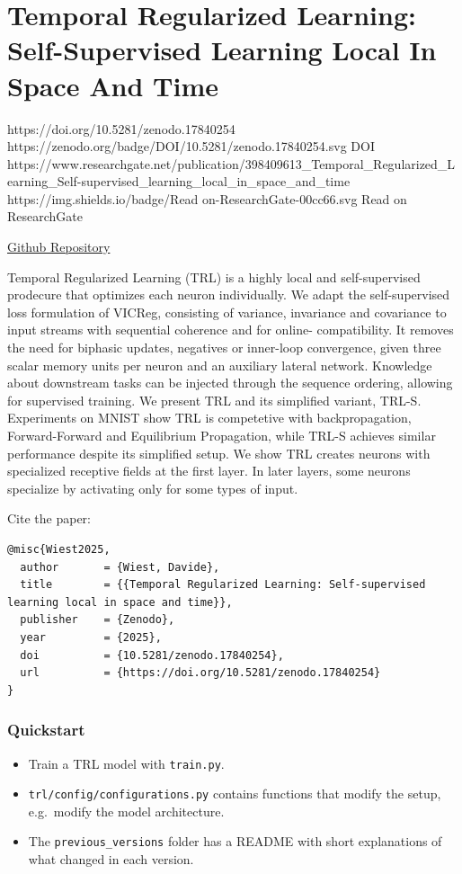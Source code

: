 \documentclass[11pt]{article}
\begin{document}
\section{Temporal Regularized Learning: Self-Supervised Learning Local In Space And Time}\label{temporal-regularized-learning-self-supervised-learning-local-in-space-and-time}

\publicationbadge
  {https://doi.org/10.5281/zenodo.17840254}
  {https://zenodo.org/badge/DOI/10.5281/zenodo.17840254.svg}
  {DOI}
\publicationbadge
  {https://www.researchgate.net/publication/398409613_Temporal_Regularized_Learning_Self-supervised_learning_local_in_space_and_time}
  {https://img.shields.io/badge/Read on-ResearchGate-00cc66.svg}
  {Read on ResearchGate}

\href{https://github.com/Axym-Labs/TRL}{Github Repository}

Temporal Regularized Learning (TRL) is a highly local and self-supervised prodecure that optimizes
each neuron individually. We adapt the self-supervised loss formulation of VICReg, consisting
of variance, invariance and covariance to input streams with sequential coherence and for online-
compatibility. It removes the need for biphasic updates, negatives or inner-loop convergence, given
three scalar memory units per neuron and an auxiliary lateral network. Knowledge about downstream
tasks can be injected through the sequence ordering, allowing for supervised training. We present
TRL and its simplified variant, TRL-S. Experiments on MNIST show TRL is competetive with
backpropagation, Forward-Forward and Equilibrium Propagation, while TRL-S achieves similar
performance despite its simplified setup. We show TRL creates neurons with specialized receptive
fields at the first layer. In later layers, some neurons specialize by activating only for some types of
input.

Cite the paper:

\begin{verbatim}
@misc{Wiest2025,
  author       = {Wiest, Davide},
  title        = {{Temporal Regularized Learning: Self-supervised learning local in space and time}},
  publisher    = {Zenodo},
  year         = {2025},
  doi          = {10.5281/zenodo.17840254},
  url          = {https://doi.org/10.5281/zenodo.17840254}
}
\end{verbatim}

\subsubsection{Quickstart}\label{quickstart}

\begin{itemize}
\tightlist
\item
  Train a TRL model with \texttt{train.py}.
\item
  \texttt{trl/config/configurations.py} contains functions that modify the setup, e.g.~modify the model architecture.
\item
  The \texttt{previous\_versions} folder has a README with short explanations of what changed in each version.
\end{itemize}
\end{document}
